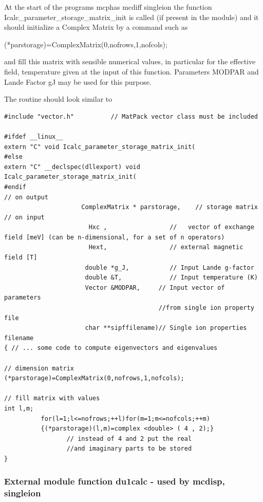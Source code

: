 At the start of the programs {\prg mcphas} {\prg mcdiff} {\prg singleion} the function {\prg %
Icalc\_parameter\_storage\_matrix\_init}
is called (if present in the module) and it should initialize a Complex Matrix by a command such as

{\prg (*parstorage)=ComplexMatrix(0,nofrows,1,nofcols);}

and fill this matrix with sensible numerical values, in particular for the effective field, temperature given at %
the input of this function.
Parameters {\prg MODPAR} and Lande Factor {\prg gJ} may be used for this purpose.

The routine should look similar to
{\footnotesize
\begin{verbatim}
#include "vector.h"          // MatPack vector class must be included

#ifdef __linux__
extern "C" void Icalc_parameter_storage_matrix_init(
#else
extern "C" __declspec(dllexport) void Icalc_parameter_storage_matrix_init(
#endif
// on output
                     ComplexMatrix * parstorage,    // storage matrix
// on input
                       Hxc ,                 //   vector of exchange field [meV] (can be n-dimensional, for a set of n operators)
                       Hext,                 // external magnetic field [T]
                      double *g_J,           // Input Lande g-factor
                      double &T,             // Input temperature (K)
                      Vector &MODPAR,     // Input vector of parameters 
                                          //from single ion property file
                      char **sipffilename)// Single ion properties filename
{ // ... some code to compute eigenvectors and eigenvalues

// dimension matrix
(*parstorage)=ComplexMatrix(0,nofrows,1,nofcols);

// fill matrix with values
int l,m;
          for(l=1;l<=nofrows;++l)for(m=1;m<=nofcols;++m)
          {(*parstorage)(l,m)=complex <double> ( 4 , 2);}
                 // instead of 4 and 2 put the real 
                 //and imaginary parts to be stored
}
\end{verbatim}
}


\subsubsection{External module function {\prg du1calc} - used by {\prg mcdisp},{\prg %
singleion}}

